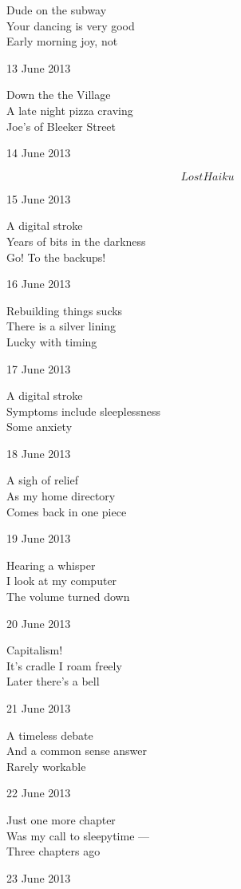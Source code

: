 \documentclass[12pt]{article}
\begin{document}
Dude on the subway \\
Your dancing is very good \\
Early morning joy, not

13 June 2013

Down the the Village \\
A late night pizza craving \\
Joe's of Bleeker Street

14 June 2013

\[ Lost Haiku \]

15 June 2013

A digital stroke \\
Years of bits in the darkness \\
Go! To the backups!

16 June 2013

Rebuilding things sucks \\
There is a silver lining \\
Lucky with timing


\newpage

17 June 2013

A digital stroke \\
Symptoms include sleeplessness \\
Some anxiety

18 June 2013

A sigh of relief \\
As my home directory \\
Comes back in one piece

19 June 2013

Hearing a whisper \\
I look at my computer \\
The volume turned down

20 June 2013

Capitalism! \\
It's cradle I roam freely \\
Later there's a bell

21 June 2013

A timeless debate \\
And a common sense answer \\
Rarely workable

22 June 2013

Just one more chapter \\
Was my call to sleepytime --- \\
Three chapters ago

23 June 2013
\end{document}
